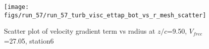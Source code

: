 \begin{figure}[H]
\centering
\texttt{[image: figs/run\_57/run\_57\_turb\_visc\_ettap\_bot\_vs\_r\_mesh\_scatter]}
\caption{Scatter plot of velocity gradient term vs radius at $z/c$=9.50, $V_{free}$=27.05, station6}
\label{fig:run_57_turb_visc_ettap_bot_vs_r_mesh_scatter}
\end{figure}


